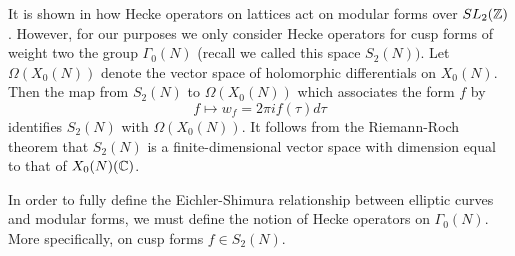 It is shown in \cite[Section I.9]{Silverman1} how Hecke operators on lattices act on modular forms over $SL_2(\mathbb{Z})$. However, for our purposes we only consider Hecke operators for cusp forms of weight two the group $\Gamma_0(N)$ (recall we called this space $S_2(N))$. Let $\Omega(X_0(N))$ denote the vector space of holomorphic differentials on $X_0(N)$. Then the map from $S_2(N)$ to $\Omega(X_0(N))$ which associates the form $f$ by
$$f \longmapsto w_f = 2 \pi i f(\tau) d\tau$$
identifies $S_2(N)$ with $\Omega(X_0(N))$. It follows from the Riemann-Roch theorem that $S_2(N)$ is a finite-dimensional vector space with dimension equal to that of $X_0(N)(\mathbb{C})$. 

In order to fully define the Eichler-Shimura relationship between elliptic curves and modular forms, we must define the notion of Hecke operators on $\Gamma_0(N)$. More specifically, on  cusp forms $f \in S_2(N)$. 

